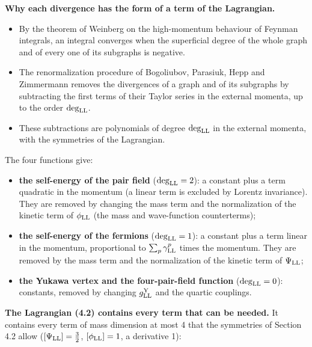 \documentclass[
  10pt,
]{article}
\providecommand{\tightlist}{%
  \setlength{\itemsep}{0pt}\setlength{\parskip}{0pt}}
\begin{document}
\textbf{Why each divergence has the form of a term of the Lagrangian.}

\begin{itemize}
\tightlist
\item
  By the theorem of Weinberg on the high-momentum behaviour of Feynman
  integrals, an integral converges when the superficial degree of the
  whole graph and of every one of its subgraphs is negative.
\item
  The renormalization procedure of Bogoliubov, Parasiuk, Hepp and
  Zimmermann removes the divergences of a graph and of its subgraphs by
  subtracting the first terms of their Taylor series in the external
  momenta, up to the order \(\deg_{\rm LL}\).
\item
  These subtractions are polynomials of degree \(\deg_{\rm LL}\) in the
  external momenta, with the symmetries of the Lagrangian.
\end{itemize}

The four functions give:

\begin{itemize}
\tightlist
\item
  \textbf{the self-energy of the pair field} (\(\deg_{\rm LL}=2\)): a
  constant plus a term quadratic in the momentum (a linear term is
  excluded by Lorentz invariance). They are removed by changing the mass
  term and the normalization of the kinetic term of \(\phi_{\rm LL}\)
  (the mass and wave-function counterterms);
\item
  \textbf{the self-energy of the fermions} (\(\deg_{\rm LL}=1\)): a
  constant plus a term linear in the momentum, proportional to
  \(\sum_p\gamma^p_{\rm LL}\) times the momentum. They are removed by
  the mass term and the normalization of the kinetic term of
  \(\Psi_{\rm LL}\);
\item
  \textbf{the Yukawa vertex and the four-pair-field function}
  (\(\deg_{\rm LL}=0\)): constants, removed by changing
  \(g^{\rm Y}_{\rm LL}\) and the quartic couplings.
\end{itemize}

\textbf{The Lagrangian (4.2) contains every term that can be needed.} It
contains every term of mass dimension at most 4 that the symmetries of
Section 4.2 allow (\([\Psi_{\rm LL}]=\tfrac32\), \([\phi_{\rm LL}]=1\),
a derivative 1):
\end{document}
